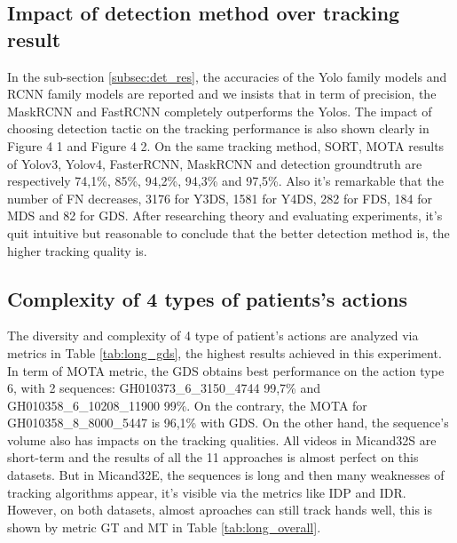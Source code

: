 \subsection{Impact of detection method over tracking result}
In the sub-section \ref{subsec:det_res}, the accuracies of the Yolo family models and RCNN family models are reported and we insists that in term of precision, the MaskRCNN and FastRCNN completely outperforms the Yolos. The impact of choosing detection tactic on the tracking performance is also shown clearly in Figure 4 1 and Figure 4 2. On the same tracking method, SORT, MOTA results of Yolov3, Yolov4, FasterRCNN, MaskRCNN and detection groundtruth are respectively 74,1\%, 85\%, 94,2\%, 94,3\% and 97,5\%. Also it’s remarkable that the number of FN decreases, 3176 for Y3DS, 1581 for Y4DS, 282 for FDS, 184 for MDS and 82 for GDS. After researching theory and evaluating experiments, it’s quit intuitive but reasonable to conclude that the better detection method is, the higher tracking quality is.
\subsection{Complexity of 4 types of patients's actions}
The diversity and complexity of 4 type of patient’s actions are analyzed via metrics in Table \ref{tab:long_gds}, the highest results achieved in this experiment. In term of MOTA metric, the GDS obtains best performance on the action type 6, with 2 sequences:  GH010373\_6\_3150\_4744 99,7\% and GH010358\_6\_10208\_11900 99\%. On the contrary, the MOTA for GH010358\_8\_8000\_5447 is 96,1\% with GDS.
On the other hand, the sequence’s volume also has impacts on the tracking qualities. All videos in Micand32S are short-term and the results of all the 11 approaches is almost perfect on this datasets. But in Micand32E, the sequences is long and then many weaknesses of tracking algorithms appear, it’s visible via the metrics like IDP and IDR. However, on both datasets, almost aproaches can still track hands well, this is shown by metric GT and MT in Table \ref{tab:long_overall}.

